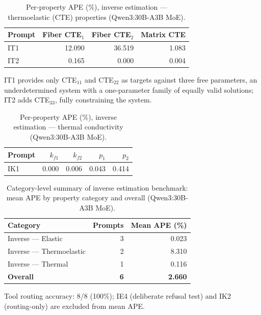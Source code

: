 \documentclass[preprint,review,10pt,number]{elsarticle}
\begin{document}
\begin{table}[htbp]
\centering
\caption{Per-property APE (\%), inverse estimation --- thermoelastic (CTE) properties (Qwen3:30B-A3B MoE).}
\label{tab:inv_mape_thermoelastic}
\begin{tabular}{lrrr}
\toprule
\textbf{Prompt} & Fiber CTE$_1$ & Fiber CTE$_2$ & Matrix CTE \\
\midrule
IT1 & 12.090 & 36.519 & 1.083 \\
IT2 & 0.165  & 0.000  & 0.004 \\
\bottomrule
\end{tabular}

\vspace{4pt}
\footnotesize IT1 provides only CTE$_{11}$ and CTE$_{22}$ as targets against three free parameters, an underdetermined system with a one-parameter family of equally valid solutions; IT2 adds CTE$_{33}$, fully constraining the system.
\end{table}

\begin{table}[htbp]
\centering
\caption{Per-property APE (\%), inverse estimation --- thermal conductivity (Qwen3:30B-A3B MoE).}
\label{tab:inv_mape_thermal}
\begin{tabular}{lrrrr}
\toprule
\textbf{Prompt} & $k_{f1}$ & $k_{f2}$ & $p_1$ & $p_2$ \\
\midrule
IK1 & 0.000 & 0.006 & 0.043 & 0.414 \\
\bottomrule
\end{tabular}
\end{table}

\begin{table}[htbp]
\centering
\caption{Category-level summary of inverse estimation benchmark: mean APE by property category and overall (Qwen3:30B-A3B MoE).}
\label{tab:inverse_summary}
\begin{tabular}{lrr}
\toprule
\textbf{Category} & \textbf{Prompts} & \textbf{Mean APE (\%)} \\
\midrule
Inverse --- Elastic       & 3 & 0.023 \\
Inverse --- Thermoelastic & 2 & 8.310 \\
Inverse --- Thermal       & 1 & 0.116 \\
\midrule
\textbf{Overall}          & \textbf{6} & \textbf{2.660} \\
\bottomrule
\end{tabular}

\vspace{4pt}
\footnotesize Tool routing accuracy: 8/8 (100\%); IE4 (deliberate refusal test) and IK2 (routing-only) are excluded from mean APE.
\end{table}
\end{document}
